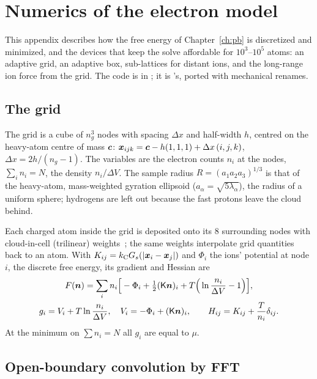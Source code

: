 \chapter{Numerics of the electron model}
\label{app:numerics}

This appendix describes how the free energy of Chapter~\ref{ch:pb} is discretized and minimized, and the devices that
keep the solve affordable for $10^3$--$10^5$ atoms: an adaptive grid, an adaptive box, sub-lattices for distant ions,
and the long-range ion force from the grid.
The code is in ; it is 's, ported with mechanical renames.

\section{The grid}

The grid is a cube of $n_g^3$ nodes with spacing $\Delta x$ and half-width $h$, centred on the heavy-atom centre of
mass $\bm{c}$: $\bm{x}_{ijk} = \bm{c} - h(1,1,1) + \Delta x\,(i,j,k)$, $\Delta x = 2h/(n_g-1)$.
The variables are the electron counts $n_i$ at the nodes, $\sum_in_i = N$, the density $n_i/\Delta V$.
The sample radius $R = (a_1a_2a_3)^{1/3}$ is that of the heavy-atom, mass-weighted gyration ellipsoid
($a_\alpha = \sqrt{5\lambda_\alpha}$), the radius of a uniform sphere; hydrogens are left out because the fast protons
leave the cloud behind.

Each charged atom inside the grid is deposited onto its 8 surrounding nodes with cloud-in-cell (trilinear)
weights~\cite{birdsall1991,hockney1988}; the same weights interpolate grid quantities back to an atom.
With $K_{ij} = k_{\mathrm C} G_s(|\bm{x}_i-\bm{x}_j|)$ and $\Phi_i$ the ions' potential at node $i$, the discrete free energy,
its gradient and Hessian are
\begin{gather}
  F(\bm{n}) = \sum_i n_i\Big[-\Phi_i + \tfrac12(\mathsf K\bm{n})_i + T\Big(\ln\frac{n_i}{\Delta V}-1\Big)\Big],\\
  g_i = V_i + T\ln\frac{n_i}{\Delta V},\quad V_i = -\Phi_i + (\mathsf K\bm{n})_i,\qquad H_{ij} = K_{ij} + \frac{T}{n_i}\delta_{ij}.
\end{gather}
At the minimum on $\sum n_i = N$ all $g_i$ are equal to $\mu$.

\section{Open-boundary convolution by FFT}

